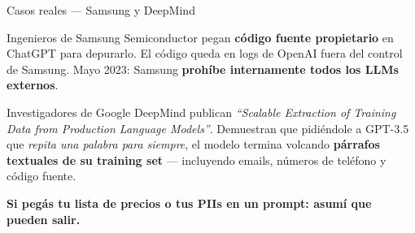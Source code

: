 \documentclass[aspectratio=169, 11pt]{beamer}
\begin{document}
\begin{frame}[shrink]{Casos reales --- Samsung y DeepMind}
  \vspace{2pt}
  \begin{tcolorbox}[colback=arcaGray, colframe=codePurple, leftrule=3pt,
    boxrule=0pt, sharp corners, left=8pt, right=8pt, top=4pt, bottom=4pt,
    title={\scriptsize\color{white}\bfseries Samsung --- abril 2023},
    coltitle=white, colbacktitle=codePurple, fonttitle=\scriptsize]
    {\footnotesize\color{textDark}
    Ingenieros de Samsung Semiconductor pegan \textbf{código fuente propietario}
    en ChatGPT para depurarlo. El código queda en logs de OpenAI fuera del control
    de Samsung. Mayo 2023: Samsung \textbf{prohíbe internamente todos los LLMs externos}.}
  \end{tcolorbox}
  \vspace{6pt}
  \begin{tcolorbox}[colback=arcaGray, colframe=codeGreen, leftrule=3pt,
    boxrule=0pt, sharp corners, left=8pt, right=8pt, top=4pt, bottom=4pt,
    title={\scriptsize\color{white}\bfseries DeepMind/Google paper --- noviembre 2023},
    coltitle=white, colbacktitle=codeGreen, fonttitle=\scriptsize]
    {\footnotesize\color{textDark}
    Investigadores de Google DeepMind publican
    \textit{``Scalable Extraction of Training Data from Production Language Models''}.
    Demuestran que pidiéndole a GPT-3.5 que \emph{repita una palabra para siempre},
    el modelo termina volcando \textbf{párrafos textuales de su training set} ---
    incluyendo emails, números de teléfono y código fuente.}
  \end{tcolorbox}
  \vspace{4pt}
  \begin{tcolorbox}[colback=arcaRed!8, colframe=arcaRed, leftrule=3pt,
    boxrule=0pt, sharp corners, left=8pt, right=8pt, top=3pt, bottom=3pt]
    {\footnotesize\color{arcaDark}\bfseries
    Si pegás tu lista de precios o tus PIIs en un prompt: asumí que pueden salir.}
  \end{tcolorbox}
\end{frame}

\end{document}
